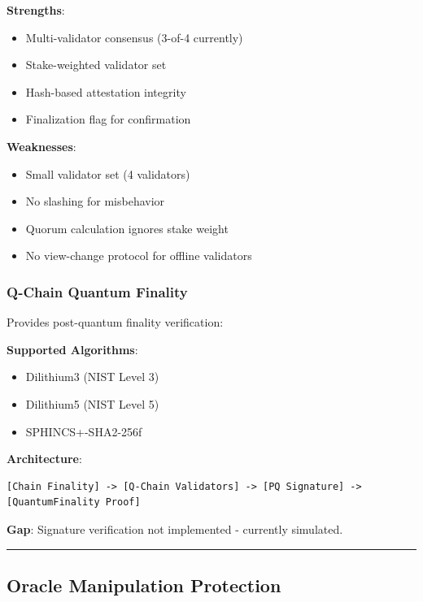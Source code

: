 \documentclass[
]{article}
\providecommand{\tightlist}{%
  \setlength{\itemsep}{0pt}\setlength{\parskip}{0pt}}
\begin{document}
\textbf{Strengths}:

\begin{itemize}
\tightlist
\item
  Multi-validator consensus (3-of-4 currently)
\item
  Stake-weighted validator set
\item
  Hash-based attestation integrity
\item
  Finalization flag for confirmation
\end{itemize}

\textbf{Weaknesses}:

\begin{itemize}
\tightlist
\item
  Small validator set (4 validators)
\item
  No slashing for misbehavior
\item
  Quorum calculation ignores stake weight
\item
  No view-change protocol for offline validators
\end{itemize}

\subsubsection{Q-Chain Quantum Finality}\label{q-chain-quantum-finality}

Provides post-quantum finality verification:

\textbf{Supported Algorithms}:

\begin{itemize}
\tightlist
\item
  Dilithium3 (NIST Level 3)
\item
  Dilithium5 (NIST Level 5)
\item
  SPHINCS+-SHA2-256f
\end{itemize}

\textbf{Architecture}:

\begin{verbatim}
[Chain Finality] -> [Q-Chain Validators] -> [PQ Signature] -> [QuantumFinality Proof]
\end{verbatim}

\textbf{Gap}: Signature verification not implemented - currently
simulated.

\begin{center}\rule{0.5\linewidth}{0.5pt}\end{center}

\subsection{Oracle Manipulation
Protection}\label{oracle-manipulation-protection}
\end{document}
